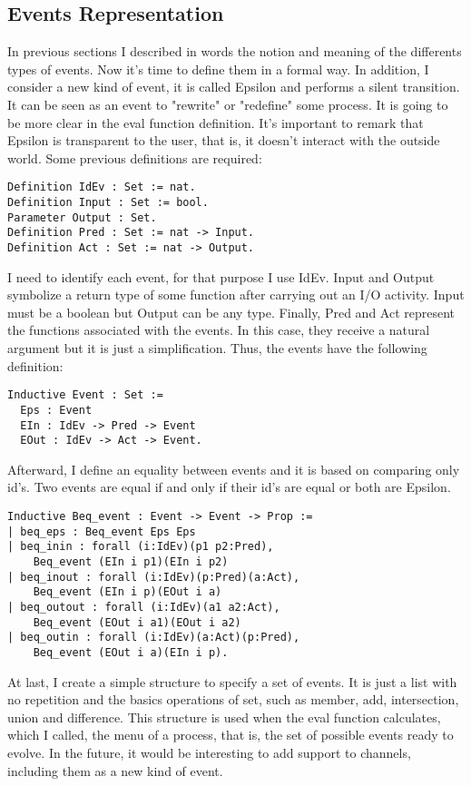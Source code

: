 \documentclass{comjnl}
\begin{document}
\subsection{Events Representation}
In previous sections I described in words the notion and meaning of the differents types of events. Now it's time to define them in a formal way. In addition, I consider a new kind of event, it is called Epsilon and performs a silent transition. It can be seen as an event to "rewrite" or "redefine" some process. It is going to be more clear in the eval function definition. It's important to remark that Epsilon is transparent to the user, that is, it doesn't interact with the outside world.
Some previous definitions are required:
\begin{verbatim}
Definition IdEv : Set := nat.
Definition Input : Set := bool.
Parameter Output : Set.
Definition Pred : Set := nat -> Input.
Definition Act : Set := nat -> Output.
\end{verbatim}
I need to identify each event, for that purpose I use IdEv. Input and Output symbolize a return type of some function after carrying out an I/O activity. Input must be a boolean but Output can be any type. Finally, Pred and Act represent the functions associated with the events. In this case, they receive a natural argument but it is just a simplification. Thus, the events have the following definition:
\begin{verbatim}
Inductive Event : Set :=
  Eps : Event
  EIn : IdEv -> Pred -> Event
  EOut : IdEv -> Act -> Event.
\end{verbatim} 
 Afterward, I define an equality between events and it is based on comparing only id's. Two events are equal if and only if their id's are equal or both are Epsilon.  \\
\begin{verbatim}
Inductive Beq_event : Event -> Event -> Prop :=
| beq_eps : Beq_event Eps Eps
| beq_inin : forall (i:IdEv)(p1 p2:Pred), 
    Beq_event (EIn i p1)(EIn i p2) 
| beq_inout : forall (i:IdEv)(p:Pred)(a:Act), 
    Beq_event (EIn i p)(EOut i a) 
| beq_outout : forall (i:IdEv)(a1 a2:Act), 
    Beq_event (EOut i a1)(EOut i a2)
| beq_outin : forall (i:IdEv)(a:Act)(p:Pred), 
    Beq_event (EOut i a)(EIn i p).
\end{verbatim}
At last, I create a simple structure to specify a set of events. It is just a list with no repetition and the basics operations of set, such as member, add, intersection, union and difference. This structure is used when the eval function calculates, which I called, the menu of a process, that is, the set of possible events ready to evolve.
In the future, it would be interesting to add support to channels, including them as a new kind of event.  
\end{document}
